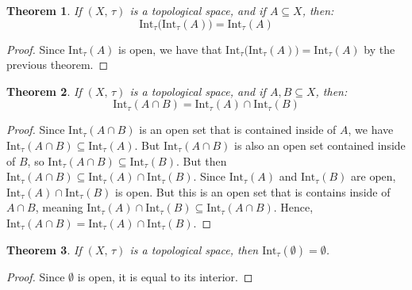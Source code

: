 \documentclass{article}
\theoremstyle{plain}
\newtheorem{theorem}{Theorem}[section]
\theoremstyle{normal}
\begin{document}
        \begin{theorem}
            If $(X,\,\tau)$ is a topological space, and if $A\subseteq{X}$,
            then:
            \begin{equation}
                \textrm{Int}_{\tau}\big(\textrm{Int}_{\tau}(A)\big)
                =\textrm{Int}_{\tau}(A)
            \end{equation}
        \end{theorem}
        \begin{proof}
            Since $\textrm{Int}_{\tau}(A)$ is open, we have that
            $\textrm{Int}_{\tau}\big(\textrm{Int}_{\tau}(A)\big)=\textrm{Int}_{\tau}(A)$
            by the previous theorem.
        \end{proof}
        \begin{theorem}
            If $(X,\,\tau)$ is a topological space, and if
            $A,B\subseteq{X}$, then:
            \begin{equation}
                \textrm{Int}_{\tau}(A\cap{B})
                =\textrm{Int}_{\tau}(A)\cap\textrm{Int}_{\tau}(B)
            \end{equation}
        \end{theorem}
        \begin{proof}
            Since $\textrm{Int}_{\tau}(A\cap{B})$ is an open set that is
            contained inside of $A$, we have
            $\textrm{Int}_{\tau}(A\cap{B})\subseteq\textrm{Int}_{\tau}(A)$. But
            $\textrm{Int}_{\tau}(A\cap{B})$ is also an open set contained inside
            of $B$, so
            $\textrm{Int}_{\tau}(A\cap{B})\subseteq\textrm{Int}_{\tau}(B)$.
            But then
            $\textrm{Int}_{\tau}(A\cap{B})\subseteq\textrm{Int}_{\tau}(A)\cap\textrm{Int}_{\tau}(B)$.
            Since $\textrm{Int}_{\tau}(A)$ and $\textrm{Int}_{\tau}(B)$ are
            open, $\textrm{Int}_{\tau}(A)\cap\textrm{Int}_{\tau}(B)$ is open.
            But this is an open set that is contains inside of
            $A\cap{B}$, meaning
            $\textrm{Int}_{\tau}(A)\cap\textrm{Int}_{\tau}(B)\subseteq\textrm{Int}_{\tau}(A\cap{B})$.
            Hence,
            $\textrm{Int}_{\tau}(A\cap{B})=\textrm{Int}_{\tau}(A)\cap\textrm{Int}_{\tau}(B)$.
        \end{proof}
        \begin{theorem}
            If $(X,\,\tau)$ is a topological space, then
            $\textrm{Int}_{\tau}(\emptyset)=\emptyset$.
        \end{theorem}
        \begin{proof}
            Since $\emptyset$ is open, it is equal to its interior.
        \end{proof}
\end{document}
